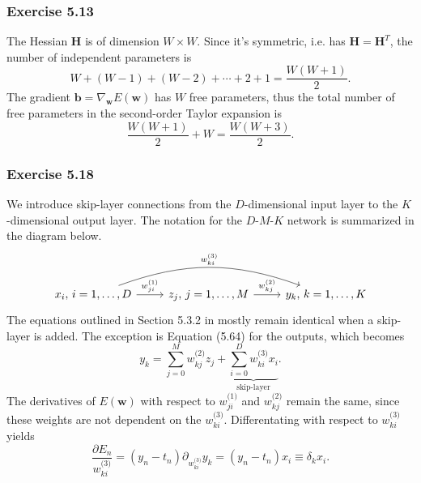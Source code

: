 \documentclass[12pt, a4paper]{article}
\newcommand{\vect}[1]{\bm{#1}}
\begin{document}
\subsubsection*{Exercise 5.13}
The Hessian $\vect{H}$ is of dimension  $W \times W$.
Since it's symmetric, i.e. has $\vect{H} = \vect{H}^T$, the number of independent parameters is
\begin{equation*}
	W + (W - 1) + (W - 2) + \cdots + 2 + 1 = \frac{W (W+1)}{2}.
\end{equation*}
The gradient $\vect{b} = \nabla_{\vect{w}} E(\vect{w})$ has $W$ free parameters, thus the total number of free parameters in the second-order Taylor expansion is
\begin{equation*}
	\frac{W(W + 1)}{2} + W = \frac{W (W + 3)}{2}.
\end{equation*}


\subsubsection*{Exercise 5.18}
We introduce skip-layer connections from the $D$-dimensional input layer to the $K$-dimensional output layer.
The notation for the $D$-$M$-$K$ network is summarized in the diagram below.
\begin{equation*}
\begin{tikzcd}
x_i, \, i=1,\ldots, D \arrow{r}{w_{ji}^{\text{(1)}}}
\arrow[bend left = 20]{rr}{w_{ki}^{\text{(3)}}}
 &  
z_j , \, j=1,\ldots, M \arrow{r}{w_{kj}^{\text{(2)}}} & 
y_k , \, k=1,\ldots, K
\end{tikzcd}
\end{equation*}
The equations outlined in Section 5.3.2 in \cite{bishop_pattern_2011} mostly remain identical when a skip-layer is added.
The exception is Equation (5.64) for the outputs, which becomes
\begin{equation*}
	y_k = \sum_{j=0}^{M} w_{kj}^{\text{(2)}} z_j
	+ \underbrace{\sum_{i=0}^{D} w_{ki}^{\text{(3)}} x_i}_{\text{skip-layer}}.
\end{equation*}
The derivatives of $E(\vect{w})$ with respect to $w_{ji}^{\text{(1)}}$ and $w_{kj}^{\text{(2)}}$ remain the same, since these weights are not dependent on the $w_{ki}^{\text{(3)}}$.
Differentating with respect to $w_{ki}^{\text{(3)}}$ yields
\begin{equation*}
	\frac{\partial E_n }{w_{ki}^{\text{(3)}}}
	 = (y_n - t_n) \partial_{w_{ki}^{\text{(3)}}} y_k
	 = (y_n - t_n) x_i \equiv \delta_k x_i.
\end{equation*}
\end{document}
